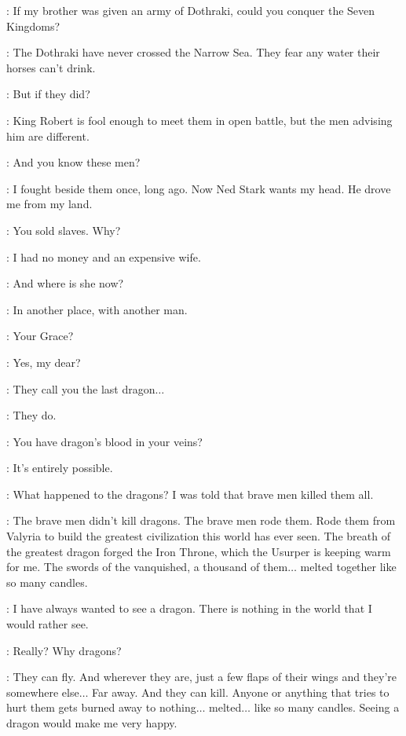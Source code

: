 
\DAENERYS: If my brother was given an army of Dothraki, could you conquer the Seven Kingdoms? 

\JORAH: The Dothraki have never crossed the Narrow Sea. They fear any water their horses can't drink. 

\DAENERYS: But if they did? 

\JORAH: King Robert is fool enough to meet them in open battle, but the men advising him are different. 

\DAENERYS: And you know these men? 

\JORAH: I fought beside them once, long ago. Now Ned Stark wants my head. He drove me from my land. 

\DAENERYS: You sold slaves. Why? 

\JORAH: I had no money and an expensive wife. 

\DAENERYS: And where is she now? 

\JORAH: In another place, with another man. 

\scene



\DOREAH: Your Grace? 

\VISERYS: Yes, my dear? 

\DOREAH: They call you the last dragon$\ldots$ 

\VISERYS: They do. 

\DOREAH: You have dragon's blood in your veins? 

\VISERYS: It's entirely possible. 

\DOREAH: What happened to the dragons? I was told that brave men killed them all. 

\VISERYS: The brave men didn't kill dragons. The brave men rode them. Rode them from Valyria to build the greatest civilization this world has ever seen. The breath of the greatest dragon forged the Iron Throne, which the Usurper is keeping warm for me. The swords of the vanquished, a thousand of them$\ldots$ melted together like so many candles. 

\DOREAH: I have always wanted to see a dragon. There is nothing in the world that I would rather see. 

\VISERYS: Really? Why dragons? 

\DOREAH: They can fly. And wherever they are, just a few flaps of their wings and they're somewhere else$\ldots$ Far away. And they can kill.  Anyone or anything that tries to hurt them gets burned away to nothing$\ldots$ melted$\ldots$ like so many candles. Seeing a dragon would make me very happy. 

